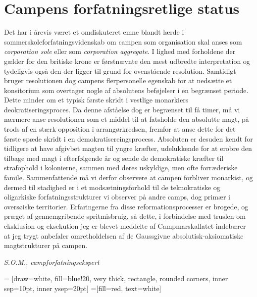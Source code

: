 \begin{minipage}[b]{0.95\linewidth}
\begin{minipage}[t]{0.47\textwidth}
\section*{Campens forfatningsretlige status}
Det har i årevis været et omdiskuteret emne blandt lærde i sommerskoleforfatningsvidenskab om campen som organisation skal anses som \emph{corporation sole} eller som \emph{corporation aggregate}. I lighed med forholdene der gælder for den britiske krone er førstnævnte den mest udbredte interpretation og tydeligvis også den der ligger til grund for ovenstående resolution. Samtidigt bruger resolutionen dog campens flerpersonelle egenskab for at nedsætte et konsitorium som overtager nogle af absolutens beføjelser i en begrænset periode. Dette minder om et typisk første skridt i vestlige monarkiers deokratiseringsproces. Da denne afståelse dog er begrænset til få timer, må vi nærmere anse resolutionen som et middel til at fatsholde den absolutte magt, på trods af en stærk opposition i arrangørkredsen, fremfor at anse dette for det første spæde skridt i en demokratisereingsprocess. Absoluten er desuden kendt for tidligere at have afgivbet magten til yngre kræfter, udelukkende for at erobre den tilbage med magt i efterfølgende år og sende de demokratiske kræfter til strafophold i kolonierne, sammen med deres uskyldige, men ofte forræderiske famile. Sammenfattende må vi derfor observere at campen forbliver monarkist, og dermed til stadighed er i et modsætningsforhold til de teknokratiske og oligarkiske forfatningsstrukturer vi observer på andre camps, dog primær i oversøiske territorier. Erfaringerne fra disse reformationsprocesser er brogede, og præget af gennemgribende spritmisbruig, så dette, i forbindelse med truslen om eksklusion og eksekution jeg er blevet meddelte af Campmarskallatet indebærer at jeg trygt anbefaler omretholdelsen af de Gaussgivne absolutisk-aksiomatiske magtstrukturer på campen.

{\flushright\emph{S.O.M., campforfatningsekspert}}

\end{minipage}
\hfill\begin{minipage}[t]{0.47\textwidth}

\vspace{1mm}
 = [draw=white, fill=blue!20, very thick,
    rectangle, rounded corners, inner sep=10pt, inner ysep=20pt]
 =[fill=red, text=white]


\end{minipage}
\end{minipage}
